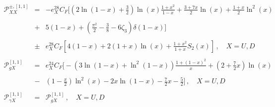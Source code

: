 \documentclass[10pt,a4paper]{article}
\begin{document}
\begin{equation}
  \begin{array}{rcl}
    \displaystyle \mathcal{P}_{XX}^{\pm,[1,1]}&=&\displaystyle
                                                  -e_X^28C_F\bigg[\left(2\ln(1-x)+\frac{3}{2}\right)\ln(x)\frac{1+x^2}{1-x}+\frac{3+7x}{2}\ln(x)+\frac{1+x}{2}\ln^2(x)\\
    \\
    &+&\displaystyle 5(1-x)+\left(\frac{\pi^2}{2}-\frac{3}{8}-6\zeta_3\right)\delta(1-x)\bigg]\\
    \\
    &\pm&\displaystyle
          e_X^28C_F\left[4(1-x)+2(1+x)\ln(x)+\frac{1+x^2}{1+x}S_2(x)\right]\,,
          \quad X=U,D\\
    \\
    \displaystyle \mathcal{P}_{gX}^{[1,1]}&=&\displaystyle
                                              e_X^24C_F\bigg[-(3\ln(1-x)+\ln^2(1-x))\frac{1+(1-x)^2}{x}+\left(2+\frac{7}{2}x\right)\ln(x)\\
    \\
    &-&\displaystyle \left(1-\frac{x}{2}\right)\ln^2(x)-2x\ln(1-x)-\frac{7}{2}x-\frac{5}{2}\bigg]\,,\quad X=U,D\\
    \\
        \displaystyle \mathcal{P}_{\gamma X}^{[1,1]}&=&\displaystyle\mathcal{P}_{gX}^{[1,1]}\,,\quad X=U,D\\
    \\


\end{array}
\end{equation}
\end{document}
